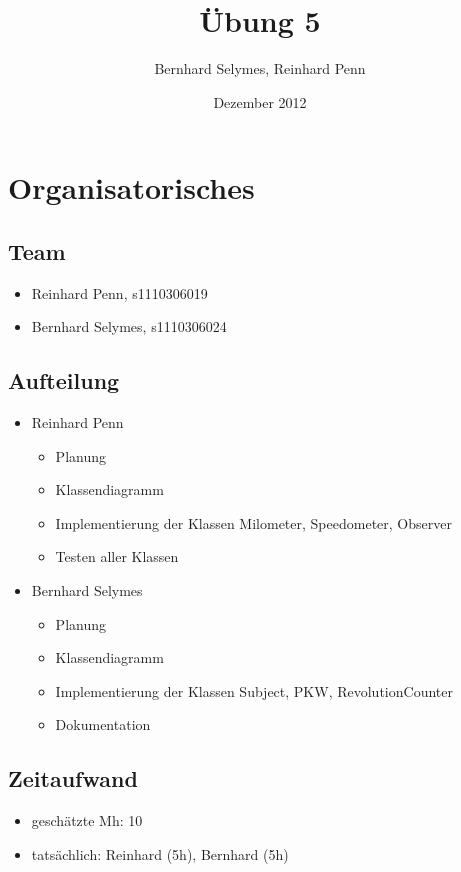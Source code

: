 \documentclass[12pt,a4paper]{article}
\begin{document}
\title{Übung 5}
\author{Bernhard Selymes, Reinhard Penn}
\date{Dezember 2012}

\normalsize

\newcommand{\CodePath}{../DrivingSimulation/DrivingSimulation/}

\section{Organisatorisches}

\subsection{Team}
	\begin {itemize} 
		\item Reinhard Penn, s1110306019 
		\item Bernhard Selymes, s1110306024
	\end {itemize}

\subsection{Aufteilung}
	\begin {itemize} 
		\item Reinhard Penn
			\begin {itemize}
				\item Planung
				\item Klassendiagramm
				\item Implementierung der Klassen Milometer, Speedometer, Observer
				\item Testen aller Klassen
			\end {itemize}
		\item Bernhard Selymes
			\begin {itemize}
				\item Planung
				\item Klassendiagramm
				\item Implementierung der Klassen Subject, PKW, RevolutionCounter
				\item Dokumentation		
			\end {itemize}
	\end {itemize}


\subsection{Zeitaufwand}
	\begin {itemize}
		\item geschätzte Mh: 10
		\item tatsächlich: Reinhard (5h), Bernhard  (5h)
	\end {itemize}
\end{document}
